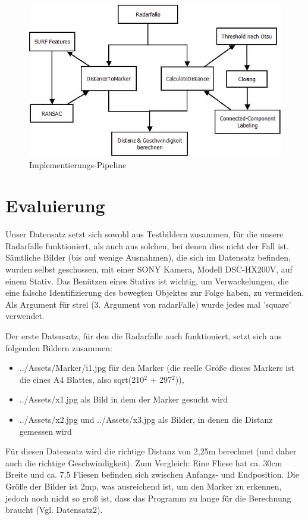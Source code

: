 \documentclass[deutsch]{scrartcl}
\begin{document}
\begin{figure}[h]
\centering
\includegraphics[scale=0.8]{Implementationspipeline}
\caption{Implementierungs-Pipeline}
\label{fig:implPipeline}
\end{figure}


\section{Evaluierung}
Unser Datensatz setzt sich sowohl aus Testbildern zusammen, für die unsere Radarfalle funktioniert, als auch aus solchen, bei denen dies nicht der Fall ist. Sämtliche Bilder (bis auf wenige Ausnahmen), die sich im Datensatz befinden, wurden selbst geschossen, mit einer SONY Kamera, Modell DSC-HX200V, auf einem Stativ. Das Benützen eines Stativs ist wichtig, um Verwackelungen, die eine falsche Identifizierung des bewegten Objektes zur Folge haben, zu vermeiden. Als Argument für strel (3. Argument von radarFalle) wurde jedes mal 'square' verwendet.

Der erste Datensatz, für den die Radarfalle auch funktioniert, setzt sich aus folgenden Bildern zusammen: 
\begin{itemize}
	\item ../Assets/Marker/i1.jpg für den Marker (die reelle Größe dieses Markers ist die eines A4 Blattes, also sqrt(210$^2$ + 297$^2$)), 
	\item ../Assets/x1.jpg als Bild in dem der Marker gesucht wird
	\item ../Assets/x2.jpg und ../Assets/x3.jpg als Bilder, in denen die Distanz gemessen wird
\end{itemize}
Für diesen Datensatz wird die richtige Distanz von 2,25m berechnet (und daher auch die richtige Geschwindigkeit). Zum Vergleich: Eine Fliese hat ca. 30cm Breite und ca. 7,5 Fliesen befinden sich zwischen Anfangs- und Endposition. Die Größe der Bilder ist 2mp, was ausreichend ist, um den Marker zu erkennen, jedoch noch nicht so groß ist, dass das Programm zu lange für die Berechnung braucht (Vgl. Datensatz2).
\end{document}
